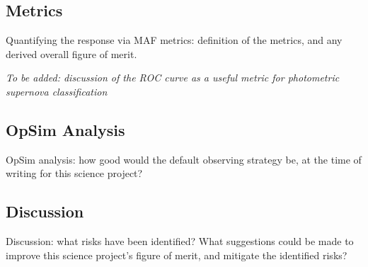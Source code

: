 
\subsection{Metrics}
\label{sec:keyword:metrics}

Quantifying the response via MAF metrics: definition of the metrics,
and any derived overall figure of merit.

\emph{To be added: discussion of the ROC curve as a useful metric for photometric supernova 
classification}


\subsection{OpSim Analysis}
\label{sec:keyword:analysis}

OpSim analysis: how good would the default observing strategy be, at
the time of writing for this science project?



\subsection{Discussion}
\label{sec:keyword:discussion}

Discussion: what risks have been identified? What suggestions could be
made to improve this science project's figure of merit, and mitigate
the identified risks?



\navigationbar
